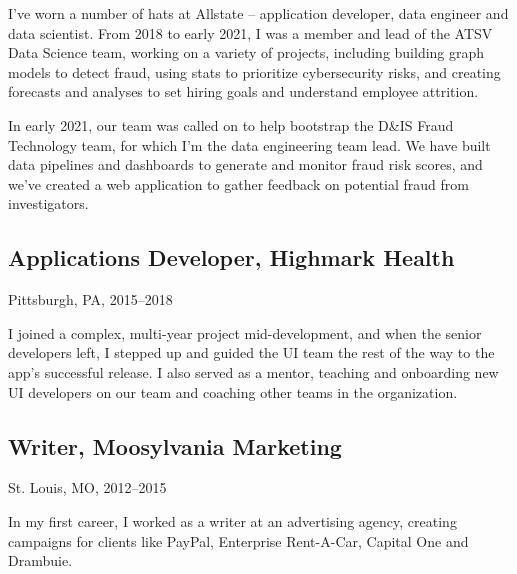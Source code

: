 \documentclass[11pt]{article}
\begin{document}
	\smallskip

	\noindent
	I've worn a number of hats at Allstate -- application developer, data engineer and data scientist. From 2018 to early 2021,
	I was a member and lead of the ATSV Data Science team, working on a variety of projects, including building graph models to detect fraud,
	using stats to prioritize cybersecurity risks, and creating forecasts and analyses to set hiring goals and understand employee attrition.
	\medskip

	\noindent
	In early 2021, our team was called on to help bootstrap the D\&IS Fraud Technology team,
	for which I'm the data engineering team lead. We have built data pipelines and dashboards to generate and monitor fraud risk scores, and we've created a web application
	to gather feedback on potential fraud from investigators.


\subsection{\normalsize{Applications Developer, Highmark Health}}
		{\fontsize{10pt}{\parskip}\selectfont Pittsburgh, PA, 2015--2018}

		\smallskip

		\noindent
	  I joined a complex, multi-year project mid-development, and when the senior developers left, I stepped up and guided the UI team the rest of the way
		to the app's successful release. I also served as a mentor, teaching and onboarding new UI developers on our team and coaching other teams
		in the organization.


\subsection{\normalsize{Writer, Moosylvania Marketing}}
	{\fontsize{10pt}{\parskip}\selectfont St. Louis, MO, 2012--2015}

	\smallskip

	\noindent
	In my first career, I worked as a writer at an advertising agency, creating campaigns for clients like PayPal, Enterprise Rent-A-Car, Capital One and Drambuie.
\end{document}
